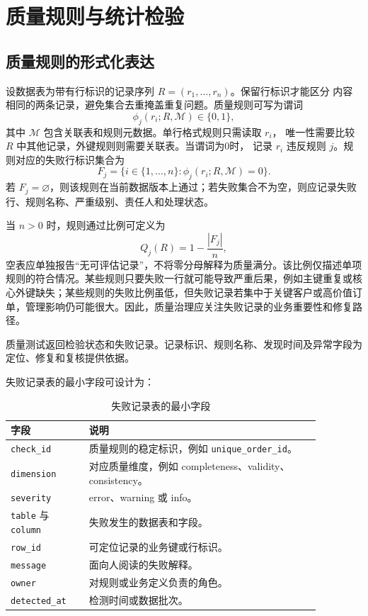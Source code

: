 \section{质量规则与统计检验}
\subsection{质量规则的形式化表达}

设数据表为带有行标识的记录序列 \(R=(r_1,\ldots,r_n)\)。保留行标识才能区分
内容相同的两条记录，避免集合去重掩盖重复问题。质量规则可写为谓词
\[
\phi_j(r_i;R,\mathcal M)\in\{0,1\},
\]
其中 \(\mathcal M\) 包含关联表和规则元数据。单行格式规则只需读取 \(r_i\)，
唯一性需要比较 \(R\) 中其他记录，外键规则则需要关联表。当谓词为0时，
记录 \(r_i\) 违反规则 \(j\)。规则对应的失败行标识集合为
\[
F_j=\{i\in\{1,\ldots,n\}:\phi_j(r_i;R,\mathcal M)=0\}.
\]
若 \(F_j=\varnothing\)，则该规则在当前数据版本上通过；若失败集合不为空，则应记录失败行、规则名称、严重级别、责任人和处理状态。

当 \(n>0\) 时，规则通过比例可定义为
\[
Q_j(R)=1-\frac{|F_j|}{n},
\]
空表应单独报告“无可评估记录”，不将零分母解释为质量满分。该比例仅描述单项规则的符合情况。某些规则只要失败一行就可能导致严重后果，例如主键重复或核心外键缺失；某些规则的失败比例虽低，但失败记录若集中于关键客户或高价值订单，管理影响仍可能很大。因此，质量治理应关注失败记录的业务重要性和修复路径。

\begin{convention}[失败记录优先原则]
质量测试返回检验状态和失败记录。记录标识、规则名称、发现时间及异常字段为定位、修复和复核提供依据。
\end{convention}

失败记录表的最小字段可设计为：
\begin{table}[htbp]
\centering
\caption{失败记录表的最小字段}
\begin{tabular}{P{0.22\linewidth}P{0.65\linewidth}}
\toprule
{}
字段 & 说明\\
\midrule
\texttt{check\_id} & 质量规则的稳定标识，例如 \texttt{unique\_order\_id}。\\
\texttt{dimension} & 对应质量维度，例如 completeness、validity、consistency。\\
\texttt{severity} & error、warning 或 info。\\
\texttt{table} 与 \texttt{column} & 失败发生的数据表和字段。\\
\texttt{row\_id} & 可定位记录的业务键或行标识。\\
\texttt{message} & 面向人阅读的失败解释。\\
\texttt{owner} & 对规则或业务定义负责的角色。\\
\texttt{detected\_at} & 检测时间或数据批次。\\
\bottomrule
\end{tabular}
\end{table}

